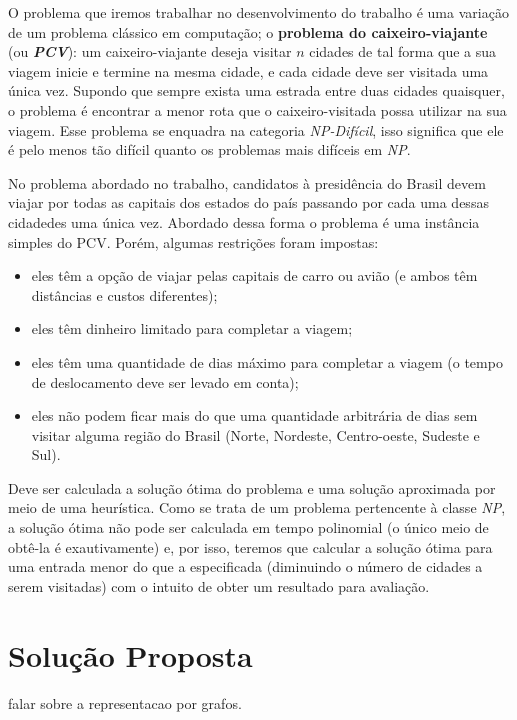 \documentclass[12pt]{article}
\begin{document}
O problema que iremos trabalhar no desenvolvimento do trabalho é uma variação de um
problema clássico em computação; o \textbf{problema do caixeiro-viajante} (ou 
\textbf{\textit{PCV}}): um caixeiro-viajante deseja visitar $n$ cidades de tal forma 
que a sua viagem inicie e termine na mesma cidade, e cada cidade deve ser visitada uma 
única vez. Supondo que sempre exista uma estrada entre duas cidades quaisquer, o problema 
é encontrar a menor rota que o caixeiro-visitada possa utilizar na sua viagem. Esse 
problema se enquadra na categoria \textit{NP-Difícil}, isso significa que ele é pelo 
menos tão difícil quanto os problemas mais difíceis em \textit{NP}. 

No problema abordado no trabalho, candidatos à presidência do Brasil devem viajar
por todas as capitais dos estados do país passando por cada uma dessas cidadedes uma
única vez. Abordado dessa forma o problema é uma instância simples do PCV. Porém, 
algumas restrições foram impostas:

\begin{itemize}
  \item eles têm a opção de viajar pelas capitais de carro ou avião (e ambos têm 
  distâncias e custos diferentes);
  \item eles têm dinheiro limitado para completar a viagem;
  \item eles têm uma quantidade de dias máximo para completar a viagem (o tempo de 
  deslocamento deve ser levado em conta);
  \item eles não podem ficar mais do que uma quantidade arbitrária de dias sem 
  visitar alguma região do Brasil (Norte, Nordeste, Centro-oeste, Sudeste e Sul).
\end{itemize}

Deve ser calculada a solução ótima do problema e uma solução aproximada por meio de
uma heurística. Como se trata de um problema pertencente à classe \textit{NP}, a solução
ótima não pode ser calculada em tempo polinomial (o único meio de obtê-la é exautivamente) 
e, por isso, teremos que calcular a solução ótima para uma entrada menor do que a 
especificada (diminuindo o número de cidades a serem visitadas) com o intuito de obter 
um resultado para avaliação.

\section{Solução Proposta}
\label{solucao_proposta}

falar sobre a representacao por grafos.
\end{document}
